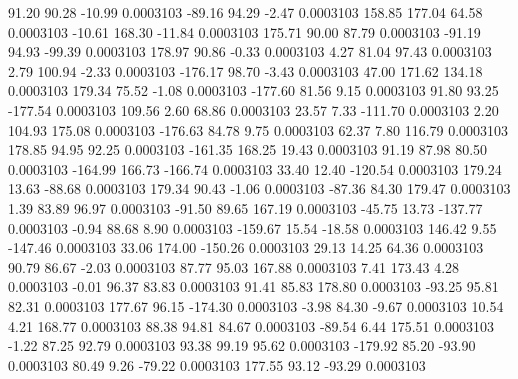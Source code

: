        91.20       90.28      -10.99     0.0003103
      -89.16       94.29       -2.47     0.0003103
      158.85      177.04       64.58     0.0003103
      -10.61      168.30      -11.84     0.0003103
      175.71       90.00       87.79     0.0003103
      -91.19       94.93      -99.39     0.0003103
      178.97       90.86       -0.33     0.0003103
        4.27       81.04       97.43     0.0003103
        2.79      100.94       -2.33     0.0003103
     -176.17       98.70       -3.43     0.0003103
       47.00      171.62      134.18     0.0003103
      179.34       75.52       -1.08     0.0003103
     -177.60       81.56        9.15     0.0003103
       91.80       93.25     -177.54     0.0003103
      109.56        2.60       68.86     0.0003103
       23.57        7.33     -111.70     0.0003103
        2.20      104.93      175.08     0.0003103
     -176.63       84.78        9.75     0.0003103
       62.37        7.80      116.79     0.0003103
      178.85       94.95       92.25     0.0003103
     -161.35      168.25       19.43     0.0003103
       91.19       87.98       80.50     0.0003103
     -164.99      166.73     -166.74     0.0003103
       33.40       12.40     -120.54     0.0003103
      179.24       13.63      -88.68     0.0003103
      179.34       90.43       -1.06     0.0003103
      -87.36       84.30      179.47     0.0003103
        1.39       83.89       96.97     0.0003103
      -91.50       89.65      167.19     0.0003103
      -45.75       13.73     -137.77     0.0003103
       -0.94       88.68        8.90     0.0003103
     -159.67       15.54      -18.58     0.0003103
      146.42        9.55     -147.46     0.0003103
       33.06      174.00     -150.26     0.0003103
       29.13       14.25       64.36     0.0003103
       90.79       86.67       -2.03     0.0003103
       87.77       95.03      167.88     0.0003103
        7.41      173.43        4.28     0.0003103
       -0.01       96.37       83.83     0.0003103
       91.41       85.83      178.80     0.0003103
      -93.25       95.81       82.31     0.0003103
      177.67       96.15     -174.30     0.0003103
       -3.98       84.30       -9.67     0.0003103
       10.54        4.21      168.77     0.0003103
       88.38       94.81       84.67     0.0003103
      -89.54        6.44      175.51     0.0003103
       -1.22       87.25       92.79     0.0003103
       93.38       99.19       95.62     0.0003103
     -179.92       85.20      -93.90     0.0003103
       80.49        9.26      -79.22     0.0003103
      177.55       93.12      -93.29     0.0003103

